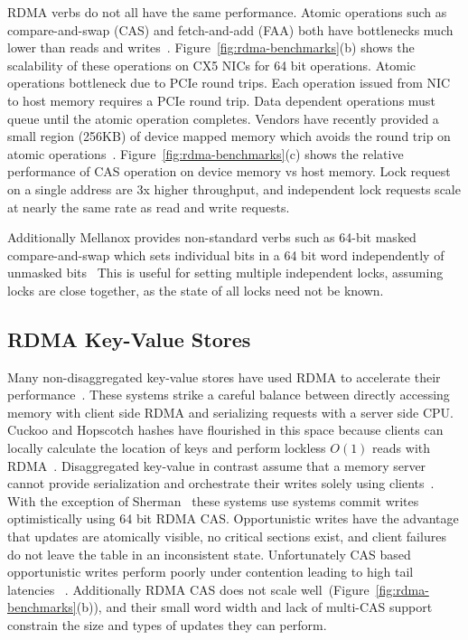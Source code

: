 RDMA verbs do not all have the same performance. Atomic
operations such as compare-and-swap (CAS) and fetch-and-add
(FAA) both have bottlenecks much lower than reads and
writes~\cite{design-guidelines,sherman}.
Figure~\ref{fig:rdma-benchmarks}(b) shows the scalability of
these operations on CX5 NICs for 64 bit operations.
Atomic operations bottleneck due to PCIe round trips. 
Each operation issued from NIC to host memory requires a
PCIe round trip. Data dependent operations must queue until
the atomic operation completes.
Vendors have recently provided a small region (256KB)
of device mapped memory which avoids the round trip on
atomic operations~\cite{device-memory}.
Figure~\ref{fig:rdma-benchmarks}(c) shows the relative
performance of CAS operation on device memory vs host
memory. Lock request on a single address are 3x higher
throughput, and independent lock requests scale at nearly
the same rate as read and write requests.

Additionally Mellanox provides non-standard verbs such as
64-bit masked compare-and-swap which sets individual bits in
a 64 bit word independently of unmasked
bits~\cite{rdma-masked-cas} This is useful for setting
multiple independent locks, assuming locks are close
together, as the state of all locks need not be known.


\subsection{RDMA Key-Value Stores}

Many non-disaggregated key-value stores have used RDMA to
accelerate their
performance~\cite{farm,memc3,erpc,herd,faast,mica,pilaf,cell,storm}.
These systems strike a careful balance between directly
accessing memory with client side RDMA and serializing
requests with a server side CPU.
Cuckoo and Hopscotch hashes have flourished in this space
because clients can locally calculate the location of keys
and perform lockless $O(1)$ reads with
RDMA~\cite{hopscotch,farm,pilaf,cuckoo}.
Disaggregated key-value in contrast assume that a memory
server cannot provide serialization and orchestrate their
writes solely using
clients~\cite{rolex,fusee,clover,sherman,ford,race}. With
the exception of Sherman~\cite{sherman} these systems use
systems commit writes optimistically using 64 bit RDMA CAS. 
Opportunistic writes have the advantage that updates are
atomically visible, no critical sections exist, and client
failures do not leave the table in an inconsistent state.
Unfortunately CAS based opportunistic writes perform poorly
under contention leading to high tail latencies
~\cite{clover}. Additionally RDMA CAS does not scale
well~\cite{design-guidelines}(Figure~\ref{fig:rdma-benchmarks}(b)),
and their small word width and lack of multi-CAS support
constrain the size and types of updates they can perform.


